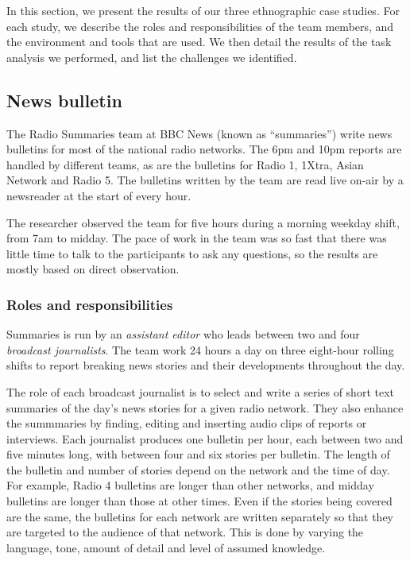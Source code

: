 In this section, we present the results of our three ethnographic case studies. For each study, we describe the roles
and responsibilities of the team members, and the environment and tools that are used. We then detail the results of
the task analysis we performed, and list the challenges we identified.


\subsection{News bulletin}\label{sec:news}
The Radio Summaries team at BBC News (known as ``summaries'') write news bulletins for most of the national radio
networks. The 6pm and 10pm reports are handled by different teams, as are the bulletins for Radio 1, 1Xtra, Asian
Network and Radio 5.  The bulletins written by the team are read live on-air by a newsreader at the start of every
hour.

The researcher observed the team for five hours during a morning weekday shift, from 7am to midday. The pace of work in
the team was so fast that there was little time to talk to the participants to ask any questions, so the results are
mostly based on direct observation.

\subsubsection{Roles and responsibilities}\label{sec:news-roles}
Summaries is run by an \textit{assistant editor} who leads between two and four \textit{broadcast journalists}. The
team work 24 hours a day on three eight-hour rolling shifts to report breaking news stories and their developments
throughout the day.

The role of each broadcast journalist is to select and write a series of short text summaries of the day's news stories
for a given radio network.  They also enhance the summmaries by finding, editing and inserting audio clips of reports
or interviews.  Each journalist produces one bulletin per hour, each between two and five minutes long, with between
four and six stories per bulletin.  The length of the bulletin and number of stories depend on the network and the time
of day. For example, Radio 4 bulletins are longer than other networks, and midday bulletins are longer than those at
other times. Even if the stories being covered are the same, the bulletins for each network are written separately so
that they are targeted to the audience of that network.  This is done by varying the language, tone, amount of detail
and level of assumed knowledge.

